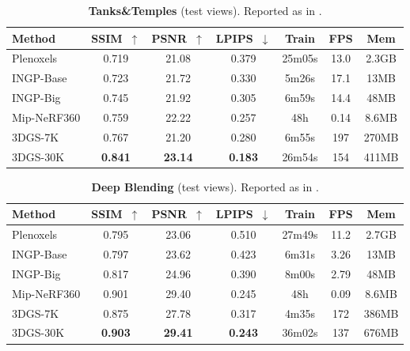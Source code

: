 \begin{enrichment}
\begin{enrichment}
\begin{enrichment}
        \begin{table}[H]
            \centering\scriptsize
            \caption{\textbf{Tanks\&Temples} (test views). Reported as in \cite{kerbl2023_3dgaussiansplatting}.}
            \label{tab:chapter23_tandt}
            \setlength\tabcolsep{5pt}
            \begin{tabular}{lcccccc}
                \toprule
                Method & SSIM~$\uparrow$ & PSNR~$\uparrow$ & LPIPS~$\downarrow$ & Train & FPS & Mem \\
                \midrule
                Plenoxels & 0.719 & 21.08 & 0.379 & 25m05s & 13.0 & 2.3GB \\
                INGP-Base & 0.723 & 21.72 & 0.330 & 5m26s  & 17.1 & 13MB \\
                INGP-Big  & 0.745 & 21.92 & 0.305 & 6m59s  & 14.4 & 48MB \\
                Mip-NeRF360 & 0.759 & 22.22 & 0.257 & 48h & 0.14 & 8.6MB \\
                3DGS-7K   & 0.767 & 21.20 & 0.280 & 6m55s  & 197 & 270MB \\
                3DGS-30K  & \textbf{0.841} & \textbf{23.14} & \textbf{0.183} & 26m54s & 154 & 411MB \\
                \bottomrule
            \end{tabular}
        \end{table}
        
        \begin{table}[H]
            \centering\scriptsize
            \caption{\textbf{Deep Blending} (test views). Reported as in \cite{kerbl2023_3dgaussiansplatting}.}
            \label{tab:chapter23_deepblending}
            \setlength\tabcolsep{5pt}
            \begin{tabular}{lcccccc}
                \toprule
                Method & SSIM~$\uparrow$ & PSNR~$\uparrow$ & LPIPS~$\downarrow$ & Train & FPS & Mem \\
                \midrule
                Plenoxels & 0.795 & 23.06 & 0.510 & 27m49s & 11.2 & 2.7GB \\
                INGP-Base & 0.797 & 23.62 & 0.423 & 6m31s  & 3.26 & 13MB \\
                INGP-Big  & 0.817 & 24.96 & 0.390 & 8m00s  & 2.79 & 48MB \\
                Mip-NeRF360 & 0.901 & 29.40 & 0.245 & 48h & 0.09 & 8.6MB \\
                3DGS-7K   & 0.875 & 27.78 & 0.317 & 4m35s  & 172 & 386MB \\
                3DGS-30K  & \textbf{0.903} & \textbf{29.41} & \textbf{0.243} & 36m02s & 137 & 676MB \\
                \bottomrule
            \end{tabular}
        \end{table}
        

\end{enrichment}
\end{enrichment}
\end{enrichment}
